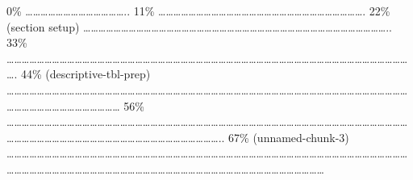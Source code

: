 \documentclass[
]{article}
\begin{document}
\textbar{} \textbar{} \textbar{} 0\% \textbar{}
\textbar\ldots\ldots\ldots\ldots\ldots\ldots\ldots\ldots\ldots\ldots\ldots\ldots\ldots..
\textbar{} 11\% \textbar{}
\textbar\ldots\ldots\ldots\ldots\ldots\ldots\ldots\ldots\ldots\ldots\ldots\ldots\ldots\ldots\ldots\ldots\ldots\ldots\ldots\ldots\ldots\ldots\ldots\ldots\ldots\ldots\ldots.
\textbar{} 22\% (section setup) \textbar{}
\textbar\ldots\ldots\ldots\ldots\ldots\ldots\ldots\ldots\ldots\ldots\ldots\ldots\ldots\ldots\ldots\ldots\ldots\ldots\ldots\ldots\ldots\ldots\ldots\ldots\ldots\ldots\ldots\ldots\ldots\ldots\ldots\ldots\ldots\ldots\ldots\ldots\ldots\ldots\ldots\ldots..
\textbar{} 33\% \textbar{}
\textbar\ldots\ldots\ldots\ldots\ldots\ldots\ldots\ldots\ldots\ldots\ldots\ldots\ldots\ldots\ldots\ldots\ldots\ldots\ldots\ldots\ldots\ldots\ldots\ldots\ldots\ldots\ldots\ldots\ldots\ldots\ldots\ldots\ldots\ldots\ldots\ldots\ldots\ldots\ldots\ldots\ldots\ldots\ldots\ldots\ldots\ldots\ldots\ldots\ldots\ldots\ldots\ldots\ldots\ldots.
\textbar{} 44\% (descriptive-tbl-prep) \textbar{}
\textbar\ldots\ldots\ldots\ldots\ldots\ldots\ldots\ldots\ldots\ldots\ldots\ldots\ldots\ldots\ldots\ldots\ldots\ldots\ldots\ldots\ldots\ldots\ldots\ldots\ldots\ldots\ldots\ldots\ldots\ldots\ldots\ldots\ldots\ldots\ldots\ldots\ldots\ldots\ldots\ldots\ldots\ldots\ldots\ldots\ldots\ldots\ldots\ldots\ldots\ldots\ldots\ldots\ldots\ldots\ldots\ldots\ldots\ldots\ldots\ldots\ldots\ldots\ldots\ldots\ldots\ldots\ldots\ldots{}
\textbar{} 56\% \textbar{}
\textbar\ldots\ldots\ldots\ldots\ldots\ldots\ldots\ldots\ldots\ldots\ldots\ldots\ldots\ldots\ldots\ldots\ldots\ldots\ldots\ldots\ldots\ldots\ldots\ldots\ldots\ldots\ldots\ldots\ldots\ldots\ldots\ldots\ldots\ldots\ldots\ldots\ldots\ldots\ldots\ldots\ldots\ldots\ldots\ldots\ldots\ldots\ldots\ldots\ldots\ldots\ldots\ldots\ldots\ldots\ldots\ldots\ldots\ldots\ldots\ldots\ldots\ldots\ldots\ldots\ldots\ldots\ldots\ldots\ldots\ldots\ldots\ldots\ldots\ldots\ldots\ldots\ldots\ldots\ldots\ldots\ldots..
\textbar{} 67\% (unnamed-chunk-3) \textbar{}
\textbar\ldots\ldots\ldots\ldots\ldots\ldots\ldots\ldots\ldots\ldots\ldots\ldots\ldots\ldots\ldots\ldots\ldots\ldots\ldots\ldots\ldots\ldots\ldots\ldots\ldots\ldots\ldots\ldots\ldots\ldots\ldots\ldots\ldots\ldots\ldots\ldots\ldots\ldots\ldots\ldots\ldots\ldots\ldots\ldots\ldots\ldots\ldots\ldots\ldots\ldots\ldots\ldots\ldots\ldots\ldots\ldots\ldots\ldots\ldots\ldots\ldots\ldots\ldots\ldots\ldots\ldots\ldots\ldots\ldots\ldots\ldots\ldots\ldots\ldots\ldots\ldots\ldots\ldots\ldots\ldots\ldots\ldots\ldots\ldots\ldots\ldots\ldots\ldots\ldots\ldots\ldots\ldots\ldots\ldots\ldots{}
\end{document}
